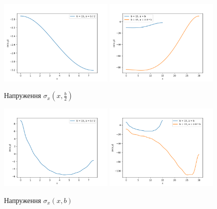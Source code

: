\begin{figure}[h!]
    \begin{center}
        \includegraphics[width=0.49\textwidth, scale=1]{images/results/static_1/sigma_x(x,b:2)1.png}
        \includegraphics[width=0.49\textwidth, scale=1]{images/results/static_1/sigma_x(x,b:2)2.png}
        \caption{Напруження $\sigma_x(x, \frac{b}{2})$}\label{static_1_sigma_x(x,b:2)}
    \end{center}
\end{figure}

\begin{figure}[h!]
    \begin{center}
        \includegraphics[width=0.49\textwidth, scale=1]{images/results/static_1/sigma_x(x,b)1.png}
        \includegraphics[width=0.49\textwidth, scale=1]{images/results/static_1/sigma_x(x,b)2.png}
        \caption{Напруження $\sigma_x(x, b)$}\label{static_1_sigma_x(x,b)}
    \end{center}
\end{figure}





